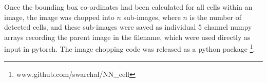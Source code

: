 \documentclass[a4paper,11pt,twoside,openright]{scrbook}
\begin{document}
%

Once the bounding box co-ordinates had been calculated for all cells within an image, the image was chopped into $n$ 
sub-images, where $n$ is the number of detected cells, and these sub-images were saved as individual 5 channel numpy 
arrays recording the parent image in the filename, which were used directly as input in pytorch.
The image chopping code was released as a python package \footnote{www.github.com/swarchal/NN\_cell}.

\end{document}
